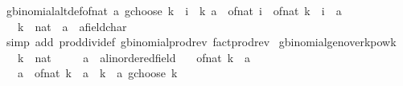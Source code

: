 \begin{isabellebody}
\begin{isamarkuptext}
\end{isamarkuptext}\isamarkuptrue%
\isamarkupfalse%
\ gbinomial{\isacharunderscore}{\kern0pt}altdef{\isacharunderscore}{\kern0pt}of{\isacharunderscore}{\kern0pt}nat{\isacharcolon}{\kern0pt}\ {\isachardoublequoteopen}a\ gchoose\ k\ {\isacharequal}{\kern0pt}\ {\isacharparenleft}{\kern0pt}{\isasymProd}i\ {\isacharequal}{\kern0pt}\ {}{\isachardot}{\kern0pt}{\isachardot}{\kern0pt}{\isacharless}{\kern0pt}k{\isachardot}{\kern0pt}\ {\isacharparenleft}{\kern0pt}a\ {\isacharminus}{\kern0pt}\ of{\isacharunderscore}{\kern0pt}nat\ i{\isacharparenright}{\kern0pt}\ {\isacharslash}{\kern0pt}\ of{\isacharunderscore}{\kern0pt}nat\ {\isacharparenleft}{\kern0pt}k\ {\isacharminus}{\kern0pt}\ i{\isacharparenright}{\kern0pt}\ {\isacharcolon}{\kern0pt}{\isacharcolon}{\kern0pt}\ {\isacharprime}{\kern0pt}a{\isacharparenright}{\kern0pt}{\isachardoublequoteclose}\isanewline
\ \ \ k\ {\isacharcolon}{\kern0pt}{\isacharcolon}{\kern0pt}\ nat\ \ a\ {\isacharcolon}{\kern0pt}{\isacharcolon}{\kern0pt}\ {\isachardoublequoteopen}{\isacharprime}{\kern0pt}a{\isacharcolon}{\kern0pt}{\isacharcolon}{\kern0pt}field{\isacharunderscore}{\kern0pt}char{\isacharunderscore}{\kern0pt}{}{\isachardoublequoteclose}\isanewline
%
\isadelimproof
\ \ %
\endisadelimproof
%
\isatagproof
{}\isamarkupfalse%
\ {\isacharparenleft}{\kern0pt}simp\ add{\isacharcolon}{\kern0pt}\ prod{\isacharunderscore}{\kern0pt}dividef\ gbinomial{\isacharunderscore}{\kern0pt}prod{\isacharunderscore}{\kern0pt}rev\ fact{\isacharunderscore}{\kern0pt}prod{\isacharunderscore}{\kern0pt}rev{\isacharparenright}{\kern0pt}%
\endisatagproof
{\isafoldproof}%
%
\isadelimproof
\isanewline
%
\endisadelimproof
\isanewline
{}\isamarkupfalse%
\ gbinomial{\isacharunderscore}{\kern0pt}ge{\isacharunderscore}{\kern0pt}n{\isacharunderscore}{\kern0pt}over{\isacharunderscore}{\kern0pt}k{\isacharunderscore}{\kern0pt}pow{\isacharunderscore}{\kern0pt}k{\isacharcolon}{\kern0pt}\isanewline
\ \ \ k\ {\isacharcolon}{\kern0pt}{\isacharcolon}{\kern0pt}\ nat\isanewline
\ \ \ \ \ a\ {\isacharcolon}{\kern0pt}{\isacharcolon}{\kern0pt}\ {\isachardoublequoteopen}{\isacharprime}{\kern0pt}a{\isacharcolon}{\kern0pt}{\isacharcolon}{\kern0pt}linordered{\isacharunderscore}{\kern0pt}field{\isachardoublequoteclose}\isanewline
\ \ \ {\isachardoublequoteopen}of{\isacharunderscore}{\kern0pt}nat\ k\ {\isasymle}\ a{\isachardoublequoteclose}\isanewline
\ \ \ {\isachardoublequoteopen}{\isacharparenleft}{\kern0pt}a\ {\isacharslash}{\kern0pt}\ of{\isacharunderscore}{\kern0pt}nat\ k\ {\isacharcolon}{\kern0pt}{\isacharcolon}{\kern0pt}\ {\isacharprime}{\kern0pt}a{\isacharparenright}{\kern0pt}\ {\isacharcircum}{\kern0pt}\ k\ {\isasymle}\ a\ gchoose\ k{\isachardoublequoteclose}\isanewline

\end{isabellebody}
